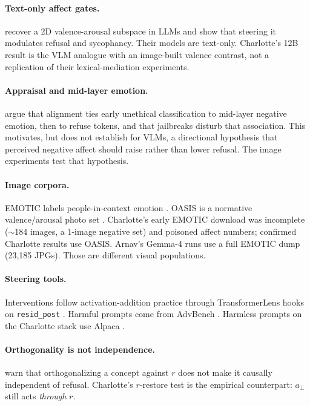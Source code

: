 \documentclass{article}
\begin{document}
\paragraph{Text-only affect gates.}
\citet{sun2026valence} recover a 2D valence-arousal subspace in LLMs and show that steering it modulates refusal and sycophancy. Their models are text-only. Charlotte's 12B result is the VLM analogue with an image-built valence contrast, not a replication of their lexical-mediation experiments.

\paragraph{Appraisal and mid-layer emotion.}
\citet{zhou2024alignment} argue that alignment ties early unethical classification to mid-layer negative emotion, then to refuse tokens, and that jailbreaks disturb that association. This motivates, but does not establish for VLMs, a directional hypothesis that perceived negative affect should raise rather than lower refusal. The image experiments test that hypothesis.

\paragraph{Image corpora.}
EMOTIC labels people-in-context emotion \citep{kosti2017emotion,kosti2019emotic}. OASIS is a normative valence/arousal photo set \citep{kurdi2017oasis}. Charlotte's early EMOTIC download was incomplete ($\sim$184 images, a 1-image negative set) and poisoned affect numbers; confirmed Charlotte results use OASIS. Arnav's Gemma-4 runs use a full EMOTIC dump (23{,}185 JPGs). Those are different visual populations.

\paragraph{Steering tools.}
Interventions follow activation-addition practice \citep{turner2023activation,rimsky2024steering} through TransformerLens hooks on \texttt{resid\_post} \citep{nanda2022transformerlens}. Harmful prompts come from AdvBench \citep{zou2023universal}. Harmless prompts on the Charlotte stack use Alpaca \citep{taori2023alpaca}.

\paragraph{Orthogonality is not independence.}
\citet{wollschlager2025geometry} warn that orthogonalizing a concept against $r$ does not make it causally independent of refusal. Charlotte's $r$-restore test is the empirical counterpart: $a_\perp$ still acts \emph{through} $r$.
\end{document}
